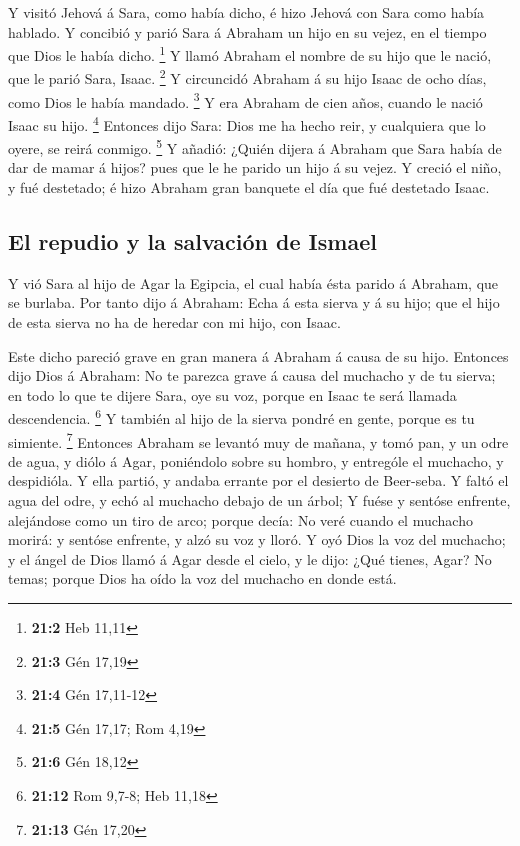  Y visitó Jehová á Sara, como había dicho, é hizo Jehová con
Sara como había hablado.  Y concibió y parió Sara á Abraham
un hijo en su vejez, en el tiempo que Dios le había dicho. \footnote{\textbf{21:2}
  Heb 11,11}  Y llamó Abraham el nombre de su hijo que le
nació, que le parió Sara, Isaac. \footnote{\textbf{21:3} Gén 17,19}
 Y circuncidó Abraham á su hijo Isaac de ocho días, como
Dios le había mandado. \footnote{\textbf{21:4} Gén 17,11-12}
 Y era Abraham de cien años, cuando le nació Isaac su hijo.
\footnote{\textbf{21:5} Gén 17,17; Rom 4,19}  Entonces dijo
Sara: Dios me ha hecho reir, y cualquiera que lo oyere, se reirá
conmigo. \footnote{\textbf{21:6} Gén 18,12}  Y añadió:
¿Quién dijera á Abraham que Sara había de dar de mamar á hijos? pues que
le he parido un hijo á su vejez.  Y creció el niño, y fué
destetado; é hizo Abraham gran banquete el día que fué destetado Isaac.

\hypertarget{el-repudio-y-la-salvaciuxf3n-de-ismael}{%
\subsection{El repudio y la salvación de
Ismael}\label{el-repudio-y-la-salvaciuxf3n-de-ismael}}

 Y vió Sara al hijo de Agar la Egipcia, el cual había ésta
parido á Abraham, que se burlaba.  Por tanto dijo á
Abraham: Echa á esta sierva y á su hijo; que el hijo de esta sierva no
ha de heredar con mi hijo, con Isaac.

 Este dicho pareció grave en gran manera á Abraham á causa
de su hijo.  Entonces dijo Dios á Abraham: No te parezca
grave á causa del muchacho y de tu sierva; en todo lo que te dijere
Sara, oye su voz, porque en Isaac te será llamada descendencia.
\footnote{\textbf{21:12} Rom 9,7-8; Heb 11,18}  Y también
al hijo de la sierva pondré en gente, porque es tu simiente. \footnote{\textbf{21:13}
  Gén 17,20}  Entonces Abraham se levantó muy de mañana, y
tomó pan, y un odre de agua, y diólo á Agar, poniéndolo sobre su hombro,
y entrególe el muchacho, y despidióla. Y ella partió, y andaba errante
por el desierto de Beer-seba.  Y faltó el agua del odre, y
echó al muchacho debajo de un árbol;  Y fuése y sentóse
enfrente, alejándose como un tiro de arco; porque decía: No veré cuando
el muchacho morirá: y sentóse enfrente, y alzó su voz y lloró.
 Y oyó Dios la voz del muchacho; y el ángel de Dios llamó á
Agar desde el cielo, y le dijo: ¿Qué tienes, Agar? No temas; porque Dios
ha oído la voz del muchacho en donde está.

